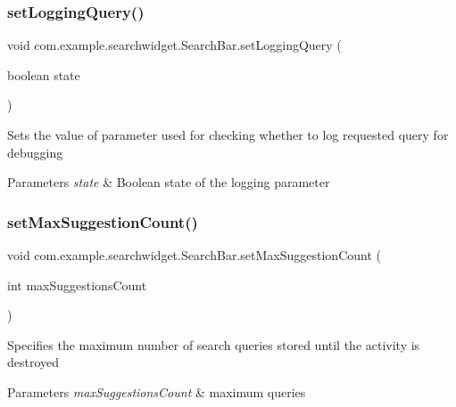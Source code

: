 \subsubsection{\texorpdfstring{setLoggingQuery()}{setLoggingQuery()}}
{\footnotesize\ttfamily void com.\+example.\+searchwidget.\+Search\+Bar.\+set\+Logging\+Query (\begin{DoxyParamCaption}\item[{boolean}]{state }\end{DoxyParamCaption})}

Sets the value of parameter used for checking whether to log requested query for debugging 
\begin{DoxyParams}{Parameters}
{\em state} & Boolean state of the logging parameter \\
\hline
\end{DoxyParams}
\mbox{\label{classcom_1_1example_1_1searchwidget_1_1_search_bar_a0f4236bdaf89946d9bdc0eb982cb7cce}} 
\subsubsection{\texorpdfstring{setMaxSuggestionCount()}{setMaxSuggestionCount()}}
{\footnotesize\ttfamily void com.\+example.\+searchwidget.\+Search\+Bar.\+set\+Max\+Suggestion\+Count (\begin{DoxyParamCaption}\item[{int}]{max\+Suggestions\+Count }\end{DoxyParamCaption})}

Specifies the maximum number of search queries stored until the activity is destroyed


\begin{DoxyParams}{Parameters}
{\em max\+Suggestions\+Count} & maximum queries \\
\hline
\end{DoxyParams}
\mbox{\label{classcom_1_1example_1_1searchwidget_1_1_search_bar_a06e0a90b2e6483038bb3d28a92a1a05c}} 
